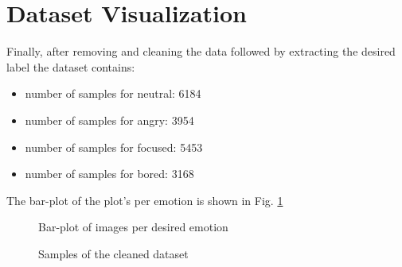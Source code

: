 \documentclass[]{report}
\begin{document}
\chapter{Dataset Visualization}
Finally, after removing and cleaning the data followed by extracting the desired label the dataset contains:
\begin{itemize}
	\item number of samples for neutral: 6184
	\item number of samples for angry: 3954
	\item number of samples for focused: 5453
	\item number of samples for bored: 3168
\end{itemize}
The bar-plot of the plot's per emotion is shown in Fig. \ref{}

\begin{figure}[h]
	\centering
	
	\caption{Bar-plot of images per desired emotion}
\end{figure}
\begin{figure}[h]
	\centering
	\qquad
	\qquad
	\qquad
	
	\caption{Samples of the cleaned dataset}
\end{figure}


 
\end{document}

